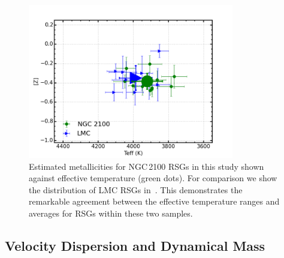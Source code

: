 \documentclass[useAMS,usenatbib]{mn2e}
\begin{document}
\begin{figure}
 \includegraphics[width=9.0cm]{NGC2100-TeffvsZ-2100-LMC}
 \caption{Estimated metallicities for NGC\,2100 RSGs in this study shown against effective temperature (green dots).
        For comparison we show the distribution of LMC RSGs in~\citet[blue triangles][]{2015ApJ...806...21D}.
        This demonstrates the remarkable agreement between the effective temperature ranges and averages for RSGs within these two samples.
\label{fig:TeffvsZ}
          }
\end{figure}




\subsection{Velocity Dispersion and Dynamical Mass} %
\label{sub:velocity_dispersion_Mdyn}
\end{document}
